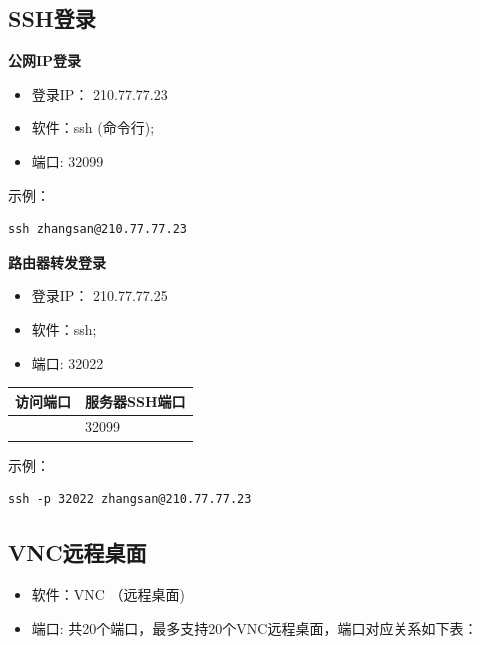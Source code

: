 \documentclass[
]{ctexbook}
\providecommand{\tightlist}{%
  \setlength{\itemsep}{0pt}\setlength{\parskip}{0pt}}
\begin{document}
\hypertarget{sshux767bux5f55}{%
\subsection{SSH登录}\label{sshux767bux5f55}}

\textbf{公网IP登录}

\begin{itemize}
\tightlist
\item
  登录IP： 210.77.77.23
\item
  软件：ssh (命令行);
\item
  端口: 32099
\end{itemize}

示例：

\begin{verbatim}
ssh zhangsan@210.77.77.23
\end{verbatim}

\textbf{路由器转发登录}

\begin{itemize}
\tightlist
\item
  登录IP： 210.77.77.25
\item
  软件：ssh;
\item
  端口: 32022
\end{itemize}

\begin{longtable}[]{@{}ll@{}}
\toprule\noalign{}
访问端口 & 服务器SSH端口 \\
\midrule\noalign{}
\endhead
\bottomrule\noalign{}
\endlastfoot
32022 & 32099 \\
\end{longtable}

示例：

\begin{verbatim}
ssh -p 32022 zhangsan@210.77.77.23
\end{verbatim}

\hypertarget{vncux8fdcux7a0bux684cux9762}{%
\subsection{VNC远程桌面}\label{vncux8fdcux7a0bux684cux9762}}

\begin{itemize}
\tightlist
\item
  软件：VNC （远程桌面)
\item
  端口: 共20个端口，最多支持20个VNC远程桌面，端口对应关系如下表：
\end{itemize}
\end{document}
